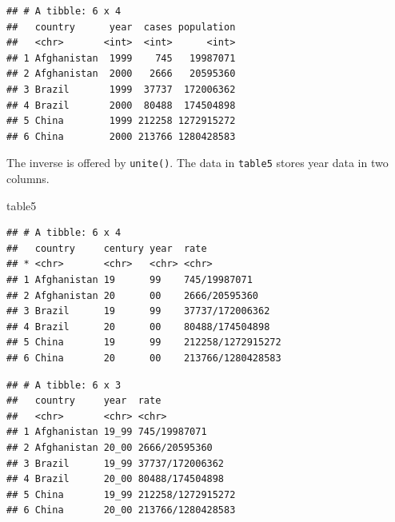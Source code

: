\documentclass[]{book}
\newenvironment{Shaded}{}{}
\newcommand{\DataTypeTok}[1]{#1}
\newcommand{\KeywordTok}[1]{\textcolor[rgb]{0.00,0.00,1.00}{#1}}
\newcommand{\NormalTok}[1]{#1}
\newcommand{\OperatorTok}[1]{#1}
\newcommand{\OtherTok}[1]{\textcolor[rgb]{1.00,0.25,0.00}{#1}}
\newcommand{\StringTok}[1]{\textcolor[rgb]{0.00,0.50,0.50}{#1}}
\begin{document}
\begin{Shaded}
\end{Shaded}

\begin{verbatim}
## # A tibble: 6 x 4
##   country      year  cases population
##   <chr>       <int>  <int>      <int>
## 1 Afghanistan  1999    745   19987071
## 2 Afghanistan  2000   2666   20595360
## 3 Brazil       1999  37737  172006362
## 4 Brazil       2000  80488  174504898
## 5 China        1999 212258 1272915272
## 6 China        2000 213766 1280428583
\end{verbatim}

The inverse is offered by \texttt{unite()}.
The data in \texttt{table5} stores year data in two columns.

\begin{Shaded}
\begin{Highlighting}[]
\NormalTok{table5}
\end{Highlighting}
\end{Shaded}

\begin{verbatim}
## # A tibble: 6 x 4
##   country     century year  rate             
## * <chr>       <chr>   <chr> <chr>            
## 1 Afghanistan 19      99    745/19987071     
## 2 Afghanistan 20      00    2666/20595360    
## 3 Brazil      19      99    37737/172006362  
## 4 Brazil      20      00    80488/174504898  
## 5 China       19      99    212258/1272915272
## 6 China       20      00    213766/1280428583
\end{verbatim}

\begin{Shaded}
\end{Shaded}

\begin{verbatim}
## # A tibble: 6 x 3
##   country     year  rate             
##   <chr>       <chr> <chr>            
## 1 Afghanistan 19_99 745/19987071     
## 2 Afghanistan 20_00 2666/20595360    
## 3 Brazil      19_99 37737/172006362  
## 4 Brazil      20_00 80488/174504898  
## 5 China       19_99 212258/1272915272
## 6 China       20_00 213766/1280428583
\end{verbatim}
\end{document}
